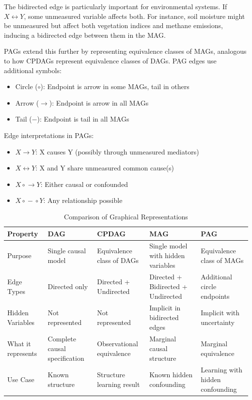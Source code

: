 The bidirected edge is particularly important for environmental systems. If $X \leftrightarrow Y$, some unmeasured variable affects both. For instance, soil moisture might be unmeasured but affect both vegetation indices and methane emissions, inducing a bidirected edge between them in the MAG.

PAGs extend this further by representing equivalence classes of MAGs, analogous to how CPDAGs represent equivalence classes of DAGs. PAG edges use additional symbols:

\begin{itemize}
  \item Circle ($\circ$): Endpoint is arrow in some MAGs, tail in others
  \item Arrow ($\rightarrow$): Endpoint is arrow in all MAGs
  \item Tail ($-$): Endpoint is tail in all MAGs
\end{itemize}


Edge interpretations in PAGs:
\begin{itemize}
\item $X \rightarrow Y$: X causes Y (possibly through unmeasured mediators)
\item $X \leftrightarrow Y$: X and Y share unmeasured common cause(s)
\item $X \circ\!\rightarrow Y$: Either causal or confounded
\item $X \circ\!-\!\circ Y$: Any relationship possible
\end{itemize}

\begin{table}[h!]
\centering
\caption{Comparison of Graphical Representations}
\label{tab:graph_types}
\begin{tabular}{p{2cm}|p{3cm}|p{3cm}|p{3cm}|p{3cm}}
\hline
\textbf{Property} & \textbf{DAG} & \textbf{CPDAG} & \textbf{MAG} & \textbf{PAG} \\
\hline
Purpose & Single causal model & Equivalence class of DAGs & Single model with hidden variables & Equivalence class of MAGs \\
Edge Types & Directed only & Directed + Undirected & Directed + Bidirected + Undirected & Additional circle endpoints \\
Hidden Variables & Not represented & Not represented & Implicit in bidirected edges & Implicit with uncertainty \\
What it represents & Complete causal specification & Observational equivalence & Marginal causal structure & Marginal equivalence \\
Use Case & Known structure & Structure learning result & Known hidden confounding & Learning with hidden confounding \\
\hline
\end{tabular}
\end{table}

